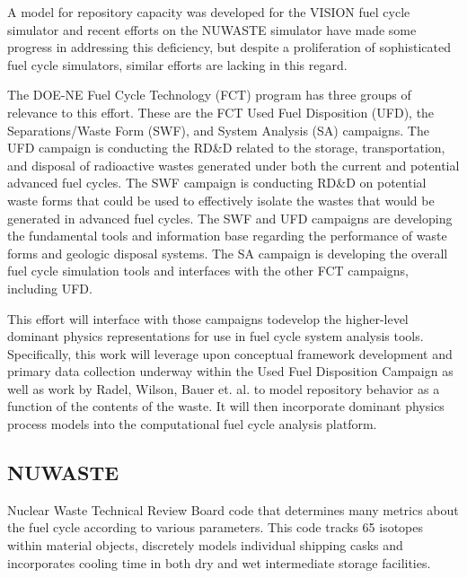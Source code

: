 A model for repository capacity was developed for the VISION fuel 
cycle simulator \cite{yacout_visionverifiable_2006}
\cite{radel_repository_2007} and recent efforts on the NUWASTE 
simulator \cite{ abkowitz_nuclear_2010} have made some progress in 
addressing this deficiency, but despite a proliferation of 
sophisticated fuel cycle simulators, similar efforts are lacking in 
this regard. 

The DOE-NE Fuel Cycle Technology (FCT) program has three groups of 
relevance to this effort.  These are the FCT Used Fuel Disposition 
(UFD), the Separations/Waste Form (SWF), and System Analysis (SA) 
campaigns.  The UFD campaign is conducting the RD\&D related to the 
storage, transportation, and disposal of radioactive wastes generated 
under both the current and potential advanced fuel cycles.  The SWF 
campaign is conducting RD\&D on potential waste forms that could be 
used to effectively isolate the wastes that would be generated in 
advanced fuel cycles.  The SWF and UFD campaigns are developing the 
fundamental tools and information base regarding the performance of 
waste forms and geologic disposal systems.  The SA campaign is 
developing the overall fuel cycle simulation tools and interfaces with 
the other FCT campaigns, including UFD. 

This effort will interface with those campaigns todevelop the 
higher-level dominant physics representations for use in fuel cycle 
system analysis tools.  Specifically, this work will leverage upon 
conceptual framework development and primary data collection underway 
within the Used Fuel Disposition Campaign as well as work by Radel, 
Wilson, Bauer et. al. to model repository behavior as a function of 
the contents of the waste.
It will then incorporate dominant physics process models into the 
\Cyclus computational fuel cycle analysis platform.




\clearpage

\subsection{NUWASTE} Nuclear Waste Technical Review Board code that 
determines many metrics about the fuel cycle according to various 
parameters. \cite{abkowitz_nuclear_2010} This code tracks 65 isotopes 
within material objects, discretely models individual shipping casks 
and incorporates cooling time in both dry and wet intermediate storage 
facilities.

